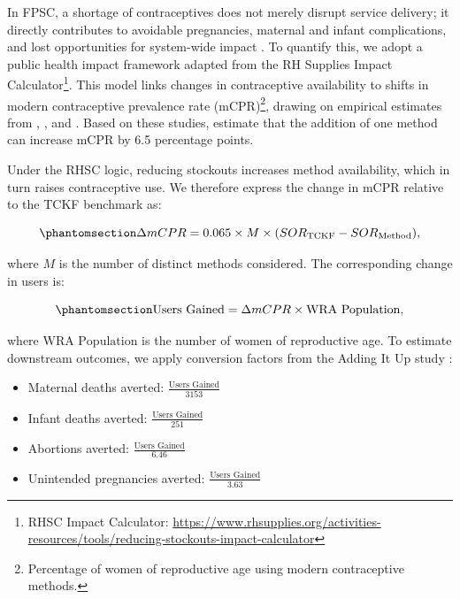\documentclass[
  authoryear,
  doubleblind,
  3p]{elsarticle}
\providecommand{\tightlist}{%
  \setlength{\itemsep}{0pt}\setlength{\parskip}{0pt}}
\begin{document}
In FPSC, a shortage of contraceptives does not merely disrupt service
delivery; it directly contributes to avoidable pregnancies, maternal and
infant complications, and lost opportunities for system-wide impact
\citep{karimi2021}. To quantify this, we adopt a public health impact
framework adapted from the RH Supplies Impact Calculator\footnote{RHSC
  Impact Calculator:
  \url{https://www.rhsupplies.org/activities-resources/tools/reducing-stockouts-impact-calculator}}.
This model links changes in contraceptive availability to shifts in
modern contraceptive prevalence rate (mCPR)\footnote{Percentage of women
  of reproductive age using modern contraceptive methods.}, drawing on
empirical estimates from \citet{karim2008measuring},
\citet{wang_how_2012}, and \citet{ross2012use}. Based on these studies,
\citet{rosen2018modeling} estimate that the addition of one method can
increase mCPR by 6.5 percentage points.

Under the RHSC logic, reducing stockouts increases method availability,
which in turn raises contraceptive use. We therefore express the change
in mCPR relative to the TCKF benchmark as:

\begin{equation}\phantomsection\label{eq-mcrp}{
\Delta mCPR = 0.065 \times M \times (SOR_{\text{TCKF}} - SOR_{\text{Method}}),
}\end{equation}

where \(M\) is the number of distinct methods considered. The
corresponding change in users is:

\begin{equation}\phantomsection\label{eq-ul}{
\text{Users Gained} = \Delta mCPR \times \text{WRA Population},
}\end{equation}

where \(\text{WRA Population}\) is the number of women of reproductive
age. To estimate downstream outcomes, we apply conversion factors from
the Adding It Up study \citep{Singh2009}:

\begin{itemize}
\tightlist
\item
  Maternal deaths averted: \(\frac{\text{Users Gained}}{3153}\)
\item
  Infant deaths averted: \(\frac{\text{Users Gained}}{251}\)
\item
  Abortions averted: \(\frac{\text{Users Gained}}{6.46}\)
\item
  Unintended pregnancies averted: \(\frac{\text{Users Gained}}{3.63}\)
\end{itemize}
\end{document}
